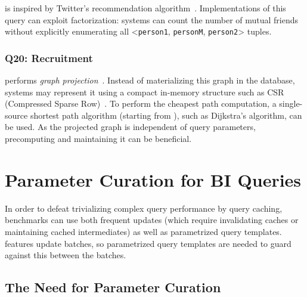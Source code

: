  is inspired by Twitter's recommendation algorithm~\cite{DBLP:conf/www/GuptaGLSWZ13}.
Implementations of this query can exploit factorization:
systems can count the number of mutual friends without explicitly enumerating all
\textsf{<}\texttt{person1}, \texttt{personM}, \texttt{person2}\textsf{>} tuples.

\subsubsection{Q20: Recruitment}

 performs \emph{graph projection}~\cite{DBLP:conf/sigmod/AnglesABBFGLPPS18}.
Instead of materializing this graph in the database,
systems may represent it using a compact in-memory structure such as CSR (Compressed Sparse Row)~\cite{DBLP:books/daglib/0009092}.
To perform the cheapest path computation, a single-source shortest path algorithm
(starting from ), such as Dijkstra's algorithm, can be used.
As the projected graph %
is independent of query parameters, precomputing and maintaining it can be beneficial.



\section{Parameter Curation for BI Queries}
\label{sec:paramgen}

In order to defeat trivializing complex query performance by query caching, benchmarks can use both frequent updates (which require invalidating caches or maintaining cached intermediates) as well as parametrized query templates.
\snbbi features update batches, so parametrized query templates are needed to guard against this between the batches.

\subsection{The Need for Parameter Curation}

